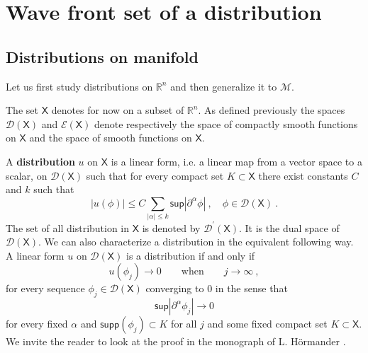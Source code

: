 \documentclass[10pt]{book}
\newcommand{\supp}{\mathsf{supp}}
\newcommand{\abs}[1]{\left|#1\right|}
\renewcommand{\sup}{\mathsf{sup}}
\newcommand{\Dcal}{\mathcal{D}}
\newcommand{\Ecal}{\mathcal{E}}
\newcommand{\Mcal}{\mathcal{M}}
\newcommand{\Rbb}{\mathbb{R}}
\newcommand{\Xsf}{\mathsf{X}}
\theoremstyle{break}
\begin{document}
\section{Wave front set of a distribution}


\subsection{Distributions on manifold}


Let us first study distributions on $\Rbb^n$ and then generalize it to $\Mcal$. 

\bigskip


The set $\Xsf$ denotes for now on a subset of $\Rbb^n$. As defined previously the spaces $\Dcal(\Xsf)$ and $\Ecal(\Xsf)$ denote respectively the space of compactly smooth functions on $\Xsf$ and the space of smooth functions on $\Xsf$.


\bigskip


A \textbf{distribution} $u$ on $\Xsf$ is a linear form, i.e. a linear map from a vector space to a scalar, on $\Dcal(\Xsf)$ such that for every compact set $K \subset \Xsf$ there exist constants $C$ and $k$ such that
%
\begin{equation*}
\abs{u(\phi)} \leq C \sum_{\abs{\alpha} \leq k} \sup \abs{\partial^\alpha \phi} \ , \quad \phi \in \Dcal(\Xsf) \ .
\end{equation*}
%
The set of all distribution in $\Xsf$ is denoted by $\Dcal^\prime(\Xsf)$. It is the dual space of $\Dcal(\Xsf)$. We can also characterize a distribution in the equivalent following way. A linear form $u$ on $\Dcal(\Xsf)$ is a distribution if and only if 
%
\begin{equation*}
u(\phi_j) \to 0 \qquad  \mbox{when} \qquad j \to \infty \ ,
\end{equation*}
%
for every sequence $\phi_j \in \Dcal(\Xsf)$ converging to $0$ in the sense that
%
\begin{equation*}
\sup\abs{\partial^\alpha\phi_j} \to 0
\end{equation*}
%
for every fixed $\alpha$ and $\supp(\phi_j) \subset K$ for all $j$ and some fixed compact set $K \subset \Xsf$. We invite the reader to look at the proof in the monograph of L. Hörmander \cite{hormander_analysis_1990}.
\end{document}
